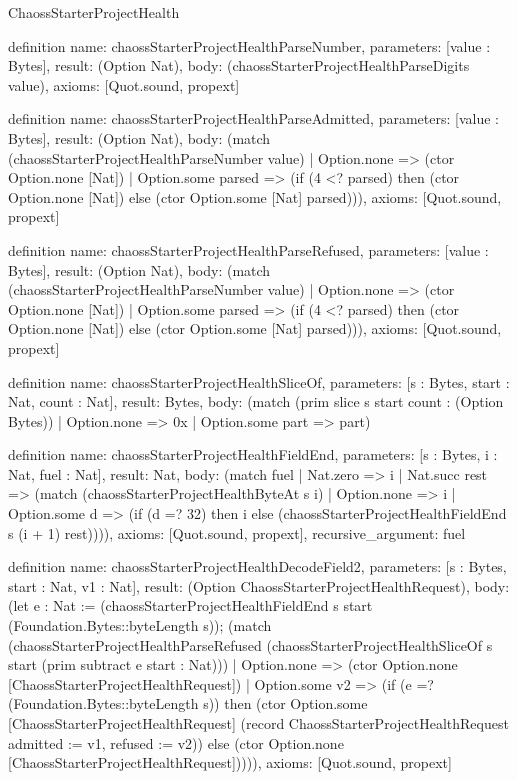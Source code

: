 \begin{lexlean}{ChaossStarterProjectHealth}
\begin{semanticmodule}
definition{
  name: chaossStarterProjectHealthParseNumber,
  parameters: [value : Bytes],
  result: (Option Nat),
  body: (chaossStarterProjectHealthParseDigits value),
  axioms: [Quot.sound, propext]
}

definition{
  name: chaossStarterProjectHealthParseAdmitted,
  parameters: [value : Bytes],
  result: (Option Nat),
  body: (match (chaossStarterProjectHealthParseNumber value)
    | Option.none => (ctor Option.none [Nat])
    | Option.some parsed => (if (4 <? parsed) then (ctor Option.none [Nat]) else (ctor Option.some [Nat] parsed))),
  axioms: [Quot.sound, propext]
}

definition{
  name: chaossStarterProjectHealthParseRefused,
  parameters: [value : Bytes],
  result: (Option Nat),
  body: (match (chaossStarterProjectHealthParseNumber value)
    | Option.none => (ctor Option.none [Nat])
    | Option.some parsed => (if (4 <? parsed) then (ctor Option.none [Nat]) else (ctor Option.some [Nat] parsed))),
  axioms: [Quot.sound, propext]
}

definition{
  name: chaossStarterProjectHealthSliceOf,
  parameters: [s : Bytes, start : Nat, count : Nat],
  result: Bytes,
  body: (match (prim slice s start count : (Option Bytes))
    | Option.none => 0x
    | Option.some part => part)
}

definition{
  name: chaossStarterProjectHealthFieldEnd,
  parameters: [s : Bytes, i : Nat, fuel : Nat],
  result: Nat,
  body: (match fuel
    | Nat.zero => i
    | Nat.succ rest => (match (chaossStarterProjectHealthByteAt s i)
      | Option.none => i
      | Option.some d => (if (d =? 32) then i else (chaossStarterProjectHealthFieldEnd s (i + 1) rest)))),
  axioms: [Quot.sound, propext],
  recursive_argument: fuel
}

definition{
  name: chaossStarterProjectHealthDecodeField2,
  parameters: [s : Bytes, start : Nat, v1 : Nat],
  result: (Option ChaossStarterProjectHealthRequest),
  body: (let e : Nat := (chaossStarterProjectHealthFieldEnd s start (Foundation.Bytes::byteLength s)); (match (chaossStarterProjectHealthParseRefused (chaossStarterProjectHealthSliceOf s start (prim subtract e start : Nat)))
    | Option.none => (ctor Option.none [ChaossStarterProjectHealthRequest])
    | Option.some v2 => (if (e =? (Foundation.Bytes::byteLength s)) then (ctor Option.some [ChaossStarterProjectHealthRequest] (record ChaossStarterProjectHealthRequest {admitted := v1, refused := v2})) else (ctor Option.none [ChaossStarterProjectHealthRequest])))),
  axioms: [Quot.sound, propext]
}


\end{semanticmodule}
\end{lexlean}
